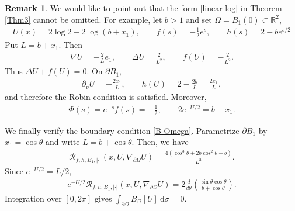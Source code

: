 \documentclass[reqno, 11pt]{amsart} %
\numberwithin{equation}{section}
\theoremstyle{definition}
\newtheorem{rmk}[thm]{Remark}
\newcommand{\pa}{\partial}
\newcommand{\R}{\mathbb{R}}
\newcommand{\calR}{\mathcal{R}}
\begin{document}
\begin{rmk}\label{ex:affine-equality-profile}
We would like to point out that the form \eqref{linear-log} in Theorem \ref{Thm3} cannot be omitted. For example, let $b>1$ and set $\Omega = B_1(0) \subset \R^2$,
\begin{align*}
       U(x)=2\log2-2\log(b+x_1), \qquad f(s)=-\frac12e^s,
       \qquad h(s)=2-be^{s/2}
\end{align*}
Put $L=b+x_1$.  Then
\begin{align*}
       \nabla U=-\frac{2}{L} e_1, \qquad \Delta U=\frac2{L^2},  \qquad f(U)=-\frac2{L^2}.
\end{align*}
Thus $\Delta U+f(U)=0$. On $\partial B_1$,
\begin{align*}
       \partial_\nu U=-\frac{2x_1}{L},
       \qquad h(U)=2-\frac{2b}{L}=\frac{2x_1}{L},
\end{align*}
and therefore the Robin condition is satisfied.  Moreover,
\begin{align*}
       \Phi(s)=e^{-s}f(s)=-\frac12,
       \qquad 2e^{-U/2}=b+x_1.
\end{align*}

We finally verify the boundary condition \eqref{B-Omega}.  Parametrize $\partial B_1$ by $x_1=\cos\theta$ and write $L=b+\cos\theta$. Then, we have
\begin{align*}
       \calR_{f,h,B_1,|\cdot|}
       (x,U,\nabla_{\pa \Omega} U)
       =\frac{4(\cos^3\theta+2b\cos^2\theta-b)}{L^3}.
\end{align*}
Since $e^{-U/2}=L/2$,
\begin{align*}
e^{-U/2}\calR_{f,h,B_1,|\cdot|}
       (x,U,\nabla_{\pa \Omega} U)
       =2\frac{d}{d\theta}
       \left(\frac{\sin\theta\cos\theta}{b+\cos\theta}\right).
\end{align*}
Integration over $[0,2\pi]$ gives $\int_{\pa \Omega} B_{\Omega}[U] \ \text{d} \sigma =0$.
\end{rmk}
\end{document}
